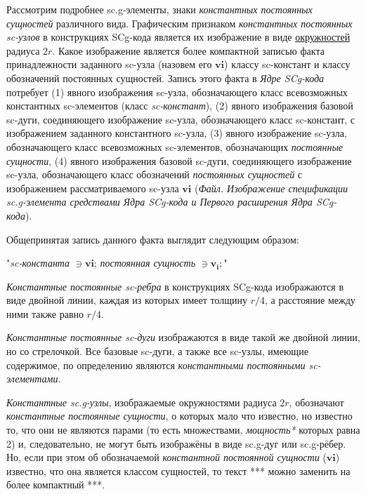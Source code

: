\begin{SCn}
{Рассмотрим подробнее sc.g-элементы, знаки \textit{константных постоянных сущностей} различного вида. Графическим признаком \textit{константных постоянных sc-узлов} в конструкциях SCg-кода является их изображение в виде \uline{окружностей} радиуса $2r$. Какое изображение является более компактной записью факта принадлежности заданного sc-узла (назовем его $\bm{vi}$) классу sc-констант и классу обозначений постоянных сущностей. Запись этого факта в \textit{Ядре SCg-кода} потребует (1) явного изображения sc-узла, обозначающего класс всевозможных константных sc-элементов (класс \textit{sc-констант}), (2) явного изображения базовой sc-дуги, соединяющего изображение sc-узла, обозначающего класс sc-констант, с изображением заданного константного sc-узла, (3) явного изображение sc-узла, обозначающего класс всевозможных sc-элементов, обозначающих \textit{постоянные сущности}, (4) явного изображения базовой sc-дуги, соединяющего изображение sc-узла, обозначающего класс обозначений \textit{постоянных сущностей} с изображением рассматриваемого sc-узла $\bm{vi}$ (\textit{Файл. Изображение спецификации sc.g-элемента средствами Ядра SCg-кода и Первого расширения Ядра SCg-кода}).

Общепринятая запись данного факта выглядит следующим образом:

"\textit{sc-константа} $\ni \bm{vi}$; \textit{постоянная сущность} $\ni \bm{v_i};$"

\textit{Константные постоянные sc-ребра} в конструкциях SCg-кода изображаются в виде двойной линии, каждая из которых имеет толщину $r/4$, а расстояние между ними также равно $r/4$. 

\textit{Константные постоянные sc-дуги} изображаются в виде такой же двойной линии, но со стрелочкой. Все базовые sc-дуги, а также все sc-узлы, имеющие содержимое, по определению являются \textit{константными постоянными sc-элементами}. 

\textit{Константные sc.g-узлы}, изображаемые окружностями радиуса $2r$, обозначают \textit{константные постоянные сущности}, о которых мало что известно, но известно то, что они не являются парами (то есть множествами, \textit{мощность*} которых равна 2) и, следовательно, не могут быть изображёны в виде sc.g-дуг или sc.g-рёбер. Но, если при этом об обозначаемой \textit{константной постоянной сущности} ($\bm{vi}$) известно, что она является классом сущностей, то текст *** можно заменить на более компактный ***. 

}
\end{SCn}

